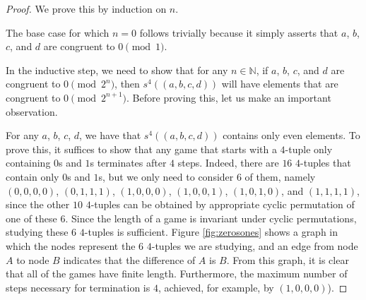 \documentclass[12pt]{amsart}
\newcommand{\diff}{s}
\newcommand{\znn}{\mathbb{N}}
\begin{document}
\begin{proof}
We prove this by induction on $n$.

The base case for which $n=0$ follows trivially because it simply asserts that $a$, $b$, $c$, and $d$ are congruent to $0\pmod{1}$.

In the inductive step, we need to show that for any $n \in \znn$, if $a$, $b$, $c$, and $d$ are congruent to $0\pmod{2^n}$, then $\diff^4((a, b, c, d))$ will have elements that are congruent to $0\pmod{2^{n+1}}$. Before proving this, let us make an important observation.

For any $a$, $b$, $c$, $d$, we have that $\diff^4((a,b,c,d))$ contains only even elements. To prove this, it suffices to show that any game that starts with a $4$-tuple only containing $0$s and $1$s terminates after $4$ steps. Indeed, there are $16$ $4$-tuples that contain only $0$s and $1$s, but we only need to consider $6$ of them, namely $(0,0,0,0)$, $(0,1,1,1)$, $(1,0,0,0)$, $(1,0,0,1)$, $(1,0,1,0)$, and $(1,1,1,1)$, since the other $10$ $4$-tuples can be obtained by appropriate cyclic permutation of one of these $6$. Since the length of a game is invariant under cyclic permutations, studying these $6$ $4$-tuples is sufficient. Figure \ref{fig:zerosones} shows a graph in which the nodes represent the $6$ $4$-tuples we are studying, and an edge from node $A$ to node $B$ indicates that the difference of $A$ is $B$. From this graph, it is clear that all of the games have finite length. Furthermore, the maximum number of steps necessary for termination is $4$, achieved, for example, by $(1,0,0,0)$).


\end{proof}
\end{document}
